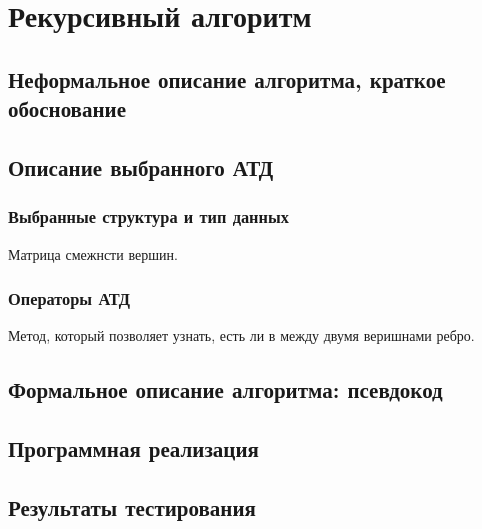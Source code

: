 \section{Рекурсивный алгоритм}

\subsection{Неформальное описание алгоритма, краткое обоснование}

\subsection{Описание выбранного АТД}
\subsubsection{Выбранные структура и тип данных}
Матрица смежнсти вершин.
\subsubsection{Операторы АТД}
Метод, который позволяет узнать, есть ли в между двумя веришнами ребро.

\subsection{Формальное описание алгоритма: псевдокод}
\begin{algorithmic}[1]
\EndProcedure
\end{algorithmic}

\subsection{Программная реализация}


\subsection{Результаты тестирования}



